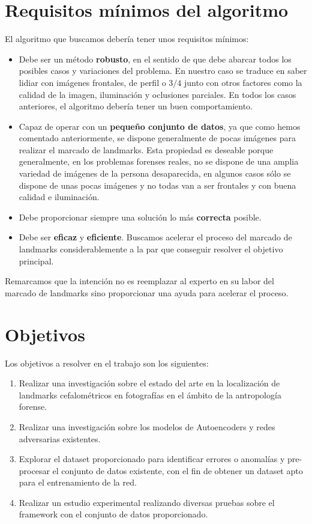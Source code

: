     \medskip 


\section{Requisitos mínimos del algoritmo}

\noindent El algoritmo que buscamos debería tener unos requisitos mínimos: 

\begin{itemize}
    \item Debe ser un método \textbf{robusto}, en el sentido de que debe abarcar todos los posibles casos y variaciones del problema. En nuestro caso se traduce en saber lidiar con imágenes frontales, de perfil o $3/4$ junto con otros factores como la calidad de la imagen, iluminación y oclusiones parciales. En todos los casos anteriores, el algoritmo debería tener un buen comportamiento.
    \item Capaz de operar con un \textbf{pequeño conjunto de datos}, ya que como hemos comentado anteriormente, se dispone generalmente de pocas imágenes para realizar el marcado de landmarks. Esta propiedad es deseable porque generalmente, en los problemas forenses reales, no se dispone de una amplia variedad de imágenes de la persona desaparecida, en algunos casos sólo se dispone de unas pocas imágenes y no todas van a ser frontales y con buena calidad e iluminación.

    \item Debe proporcionar siempre una solución lo más \textbf{correcta} posible.  
    
    \item Debe ser \textbf{eficaz} y \textbf{eficiente}. Buscamos acelerar el proceso del marcado de landmarks considerablemente a la par que conseguir resolver el objetivo principal.
\end{itemize}

\noindent Remarcamos que la intención no es reemplazar al experto en su labor del marcado de landmarks sino proporcionar una ayuda para acelerar el proceso.

\section{Objetivos}

\noindent Los objetivos a resolver en el trabajo son los siguientes: 

\begin{enumerate}
    \item Realizar una investigación sobre el estado del arte en la localización de landmarks cefalométricos en fotografías en el ámbito de la antropología forense.
    \item Realizar una investigación sobre los modelos de Autoencoders y redes adversarias existentes.
    \item Explorar el dataset proporcionado para identificar errores o anomalías y pre-procesar el conjunto de datos existente, con el fin de obtener un dataset apto para el entrenamiento de la red.
    \item Realizar un estudio experimental realizando diversas pruebas sobre el framework con el conjunto de datos proporcionado.
\end{enumerate}

